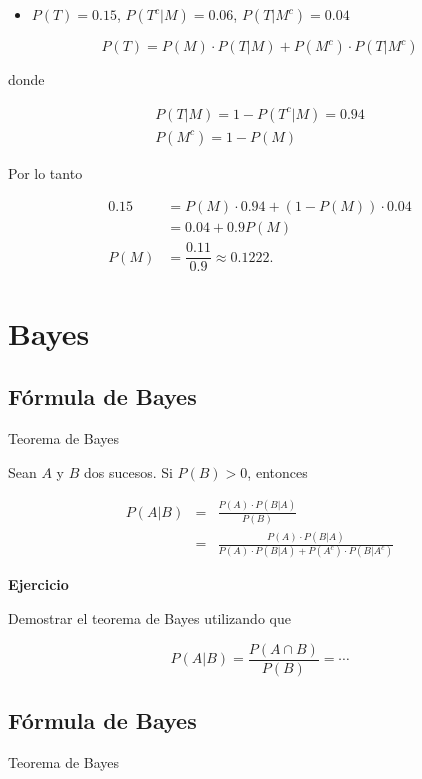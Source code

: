 \documentclass[]{book}
\providecommand{\tightlist}{%
  \setlength{\itemsep}{0pt}\setlength{\parskip}{0pt}}
\begin{document}
\begin{itemize}
\tightlist
\item
  \(P(T)=0.15\), \(P(T^c|M)=0.06\), \(P(T|M^c)=0.04\)
\end{itemize}

\[
P(T) =P(M)\cdot P(T|M)+P(M^c)\cdot P(T|M^c)
\]

donde

\[
\begin{array}{l}
P(T|M)=1-P(T^c|M)=0.94 \\[1ex]
P(M^c)=1-P(M)
\end{array}
\]

Por lo tanto

\[
\begin{array}{rl}
0.15 & = P(M)\cdot 0.94+(1-P(M))\cdot 0.04\\
 & =0.04+0.9P(M)\\[1ex]
P(M) & =\dfrac{0.11}{0.9}\approx 0.1222.
\end{array}
\]

\hypertarget{bayes}{%
\section{Bayes}\label{bayes}}

\hypertarget{fuxf3rmula-de-bayes}{%
\subsection{Fórmula de Bayes}\label{fuxf3rmula-de-bayes}}

Teorema de Bayes

Sean \(A\) y \(B\) dos sucesos. Si \(P(B)>0\), entonces

\begin{eqnarray*}
P(A|B) & = & \frac{P(A)\cdot P(B\big|A)}{P(B)}\\
&=& \frac{P(A)\cdot P(B\big|A)}{P(A)\cdot P(B\big|A)+P(A^c)\cdot P(B\big|A^c)}
\end{eqnarray*}

\textbf{Ejercicio}

Demostrar el teorema de Bayes utilizando que

\[P(A|B) =\frac{P(A\cap B)}{P(B)}=\cdots\]

\hypertarget{fuxf3rmula-de-bayes-1}{%
\subsection{Fórmula de Bayes}\label{fuxf3rmula-de-bayes-1}}

Teorema de Bayes
\end{document}
